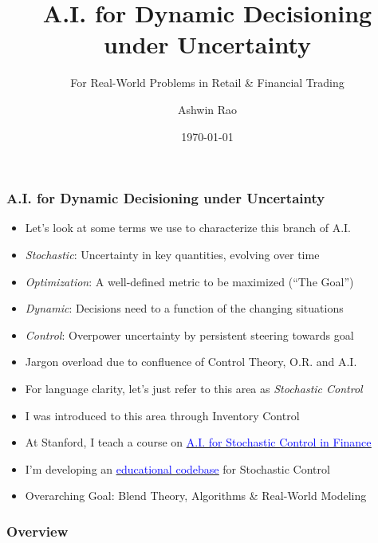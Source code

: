 \documentclass[handout]{beamer}
\title[A.I For Retail/Finance]{A.I. for Dynamic Decisioning under Uncertainty} %
\subtitle{For Real-World Problems in Retail \& Financial Trading}
\author{Ashwin Rao} %
\institute[Target/Stanford] %
{VP Data Science at Target \& Adjunct Faculty at Stanford
}
\date{\today} %
\begin{document}
\begin{frame}
\titlepage %
\end{frame}

\begin{frame}
\frametitle{A.I. for Dynamic Decisioning under Uncertainty}
\pause
\begin{itemize}[<+->]
\item Let's look at some terms we use to characterize this branch of A.I.
\item {\em Stochastic}: Uncertainty in key quantities, evolving over time
\item {\em Optimization}: A well-defined metric to be maximized (``The Goal'')
\item {\em Dynamic}:  Decisions need to a function of the changing situations
\item {\em Control}: Overpower uncertainty by persistent steering towards goal
\item Jargon overload due to confluence of Control Theory, O.R. and A.I.
\item For language clarity, let's just refer to this area as {\em Stochastic Control}
\item I was introduced to this area through Inventory Control
\item At Stanford, I teach a course on \href{https://github.com/coverdrive/technical-documents/blob/master/finance/cme241/Stanford-CME241.pdf}{\underline{\textcolor{blue}{A.I. for Stochastic Control in Finance}}}
\item I'm developing an \href{https://github.com/coverdrive/MDP-DP-RL}{\underline{\textcolor{blue}{educational codebase}}} for Stochastic Control 
\item Overarching Goal: Blend Theory, Algorithms \& Real-World Modeling
\end{itemize}
\end{frame}


\begin{frame}
\frametitle{Overview} %
\tableofcontents %
\end{frame}
\end{document}
